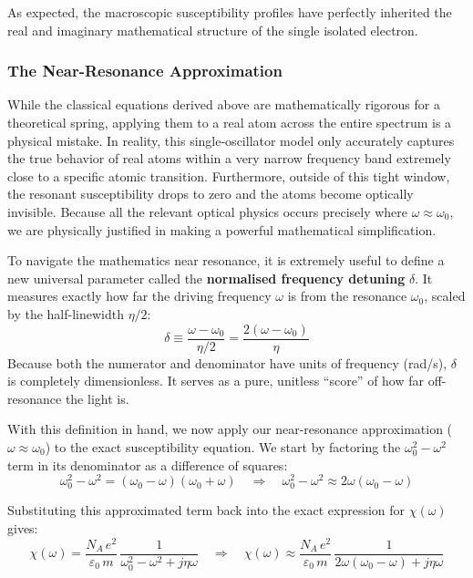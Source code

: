 As expected, the macroscopic susceptibility profiles have perfectly inherited the real and imaginary mathematical structure of the single isolated electron.

\subsubsection{The Near-Resonance Approximation}

While the classical equations derived above are mathematically rigorous for a theoretical spring, applying them to a real atom across the entire spectrum is a physical mistake. In reality, this single-oscillator model only accurately captures the true behavior of real atoms within a very narrow frequency band extremely close to a specific atomic transition. Furthermore, outside of this tight window, the resonant susceptibility drops to zero and the atoms become optically invisible. Because all the relevant optical physics occurs precisely where $\omega \approx \omega_0$, we are physically justified in making a powerful mathematical simplification.

To navigate the mathematics near resonance, it is extremely useful to define a new universal parameter called the \textbf{normalised frequency detuning} $\delta$. It measures exactly how far the driving frequency $\omega$ is from the resonance $\omega_0$, scaled by the half-linewidth $\eta/2$:
\begin{equation*}
    \delta \equiv \frac{\omega - \omega_0}{\eta/2} = \frac{2(\omega - \omega_0)}{\eta}
\end{equation*}
Because both the numerator and denominator have units of frequency (rad/s), $\delta$ is completely dimensionless. It serves as a pure, unitless ``score'' of how far off-resonance the light is.

With this definition in hand, we now apply our near-resonance approximation ($\omega \approx \omega_0$) to the exact susceptibility equation. We start by factoring the $\omega_0^2 - \omega^2$ term in its denominator as a difference of squares:
\begin{equation*}
    \omega_0^2 - \omega^2 = (\omega_0 - \omega)(\omega_0 + \omega) \quad \Rightarrow \quad \omega_0^2 - \omega^2 \approx 2\omega(\omega_0 - \omega)
\end{equation*}

Substituting this approximated term back into the exact expression for $\chi(\omega)$ gives:
\begin{equation*}
    \chi(\omega) = \frac{N_A\,e^2}{\varepsilon_0\,m}\,\frac{1}{\omega_0^2 - \omega^2 + j\eta\omega} \quad \Rightarrow \quad \chi(\omega) \approx \frac{N_A\,e^2}{\varepsilon_0\,m}\,\frac{1}{2\omega(\omega_0 - \omega) + j\eta\omega}
\end{equation*}

